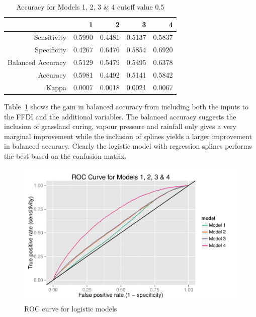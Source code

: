 \documentclass[11pt,a4paper]{article}
\begin{document}
\begin{table}
  \centering
  \begin{tabular}{rrrrr}
    \toprule
                      & 1      & 2      & 3      & 4 \\
    \midrule
    Sensitivity       & 0.5990 & 0.4481 & 0.5137 & 0.5837 \\
    Specificity       & 0.4267 & 0.6476 & 0.5854 & 0.6920 \\
    Balanced Accuracy & 0.5129 & 0.5479 & 0.5495 & 0.6378 \\
    Accuracy          & 0.5981 & 0.4492 & 0.5141 & 0.5842 \\
    Kappa             & 0.0007 & 0.0018 & 0.0021 & 0.0067 \\
    \bottomrule
  \end{tabular}
  \caption{Accuracy for Models 1, 2, 3 \& 4 cutoff value 0.5}
  \label{table:acc2}
\end{table}

Table~\ref{table:acc2} shows the gain in balanced accuracy from including both the inputs to the FFDI and the additional variables. The balanced accuracy suggests the inclusion of grassland curing, vapour pressure and rainfall only gives a very marginal improvement while the inclusion of splines yields a larger improvement in balanced accuracy. Clearly the logistic model with regression splines performs the best based on the confusion matrix.

\begin{figure}
  \centering
	\includegraphics[width=1\columnwidth]{figures/all_roc.pdf}
  \caption{ROC curve for logistic models}
  \label{fig:ffdi}
\end{figure}
\end{document}
